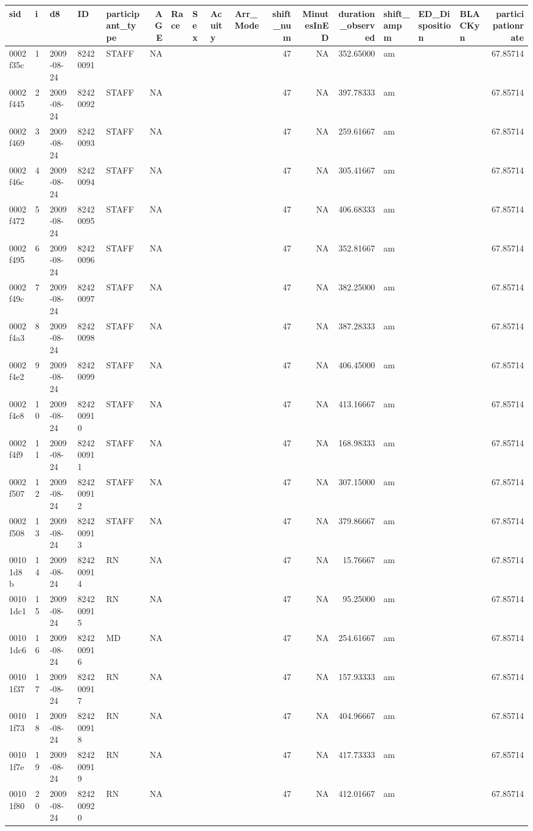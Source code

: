 \documentclass[]{elsarticle} %
\begin{document}
\begin{longtable}[]{@{}lllllrllllrrrlllr@{}}
\toprule
sid & i & d8 & ID & participant\_type & AGE & Race & Sex & Acuity &
Arr\_Mode & shift\_num & MinutesInED & duration\_observed & shift\_ampm
& ED\_Disposition & BLACKyn & participationrate\tabularnewline
\midrule
\endhead
0002f35c & 1 & 2009-08-24 & 82420091 & STAFF & NA & & & & & 47 & NA &
352.65000 & am & & & 67.85714\tabularnewline
0002f445 & 2 & 2009-08-24 & 82420092 & STAFF & NA & & & & & 47 & NA &
397.78333 & am & & & 67.85714\tabularnewline
0002f469 & 3 & 2009-08-24 & 82420093 & STAFF & NA & & & & & 47 & NA &
259.61667 & am & & & 67.85714\tabularnewline
0002f46c & 4 & 2009-08-24 & 82420094 & STAFF & NA & & & & & 47 & NA &
305.41667 & am & & & 67.85714\tabularnewline
0002f472 & 5 & 2009-08-24 & 82420095 & STAFF & NA & & & & & 47 & NA &
406.68333 & am & & & 67.85714\tabularnewline
0002f495 & 6 & 2009-08-24 & 82420096 & STAFF & NA & & & & & 47 & NA &
352.81667 & am & & & 67.85714\tabularnewline
0002f49c & 7 & 2009-08-24 & 82420097 & STAFF & NA & & & & & 47 & NA &
382.25000 & am & & & 67.85714\tabularnewline
0002f4a3 & 8 & 2009-08-24 & 82420098 & STAFF & NA & & & & & 47 & NA &
387.28333 & am & & & 67.85714\tabularnewline
0002f4e2 & 9 & 2009-08-24 & 82420099 & STAFF & NA & & & & & 47 & NA &
406.45000 & am & & & 67.85714\tabularnewline
0002f4e8 & 10 & 2009-08-24 & 824200910 & STAFF & NA & & & & & 47 & NA &
413.16667 & am & & & 67.85714\tabularnewline
0002f4f9 & 11 & 2009-08-24 & 824200911 & STAFF & NA & & & & & 47 & NA &
168.98333 & am & & & 67.85714\tabularnewline
0002f507 & 12 & 2009-08-24 & 824200912 & STAFF & NA & & & & & 47 & NA &
307.15000 & am & & & 67.85714\tabularnewline
0002f508 & 13 & 2009-08-24 & 824200913 & STAFF & NA & & & & & 47 & NA &
379.86667 & am & & & 67.85714\tabularnewline
00101d8b & 14 & 2009-08-24 & 824200914 & RN & NA & & & & & 47 & NA &
15.76667 & am & & & 67.85714\tabularnewline
00101dc1 & 15 & 2009-08-24 & 824200915 & RN & NA & & & & & 47 & NA &
95.25000 & am & & & 67.85714\tabularnewline
00101dc6 & 16 & 2009-08-24 & 824200916 & MD & NA & & & & & 47 & NA &
254.61667 & am & & & 67.85714\tabularnewline
00101f37 & 17 & 2009-08-24 & 824200917 & RN & NA & & & & & 47 & NA &
157.93333 & am & & & 67.85714\tabularnewline
00101f73 & 18 & 2009-08-24 & 824200918 & RN & NA & & & & & 47 & NA &
404.96667 & am & & & 67.85714\tabularnewline
00101f7e & 19 & 2009-08-24 & 824200919 & RN & NA & & & & & 47 & NA &
417.73333 & am & & & 67.85714\tabularnewline
00101f80 & 20 & 2009-08-24 & 824200920 & RN & NA & & & & & 47 & NA &
412.01667 & am & & & 67.85714\tabularnewline

\end{longtable}
\end{document}
